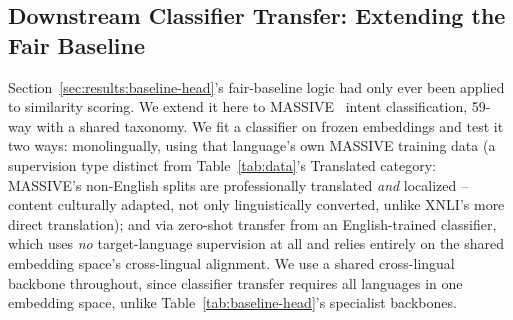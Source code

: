 \documentclass[manuscript]{acmart}
\begin{document}
\subsection{Downstream Classifier Transfer: Extending the Fair Baseline}
\label{sec:results:classification}

Section~\ref{sec:results:baseline-head}'s fair-baseline logic had only ever been applied to similarity scoring. We extend it here to MASSIVE~\citep{fitzgerald2022massive} intent classification, 59-way with a shared taxonomy. We fit a classifier on frozen embeddings and test it two ways: monolingually, using that language's own MASSIVE training data (a supervision type distinct from Table~\ref{tab:data}'s Translated category: MASSIVE's non-English splits are professionally translated \emph{and} localized -- content culturally adapted, not only linguistically converted, unlike XNLI's more direct translation); and via zero-shot transfer from an English-trained classifier, which uses \emph{no} target-language supervision at all and relies entirely on the shared embedding space's cross-lingual alignment. We use a shared cross-lingual backbone throughout, since classifier transfer requires all languages in one embedding space, unlike Table~\ref{tab:baseline-head}'s specialist backbones.
\end{document}
